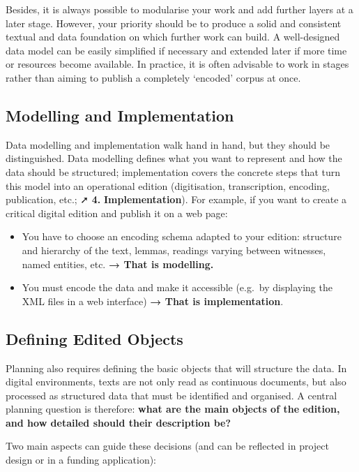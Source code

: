 \documentclass[
  letterpaper,
  DIV=11,
  numbers=noendperiod]{scrreprt}
\begin{document}
Besides, it is always possible to modularise your work and add further
layers at a later stage. However, your priority should be to produce a
solid and consistent textual and data foundation on which further work
can build. A well-designed data model can be easily simplified if
necessary and extended later if more time or resources become available.
In practice, it is often advisable to work in stages rather than aiming
to publish a completely `encoded' corpus at once.

\subsection{Modelling and
Implementation}\label{modelling-and-implementation}

Data modelling and implementation walk hand in hand, but they should be
distinguished. Data modelling defines what you want to represent and how
the data should be structured; implementation covers the concrete steps
that turn this model into an operational edition (digitisation,
transcription, encoding, publication, etc.; ➚ \textbf{4.}
\textbf{Implementation}). For example, if you want to create a critical
digital edition and publish it on a web page:

\begin{itemize}
\item
  You have to choose an encoding schema adapted to your edition:
  structure and hierarchy of the text, lemmas, readings varying between
  witnesses, named entities, etc. \textbf{→ That is modelling.}
\item
  You must encode the data and make it accessible (e.g.~by displaying
  the XML files in a web interface) \textbf{→ That is implementation}.
\end{itemize}

\subsection{Defining Edited Objects}\label{defining-edited-objects}

Planning also requires defining the basic objects that will structure
the data. In digital environments, texts are not only read as continuous
documents, but also processed as structured data that must be identified
and organised. A central planning question is therefore: \textbf{what
are the main objects of the edition, and how detailed should their
description be?}

Two main aspects can guide these decisions (and can be reflected in
project design or in a funding application):
\end{document}
